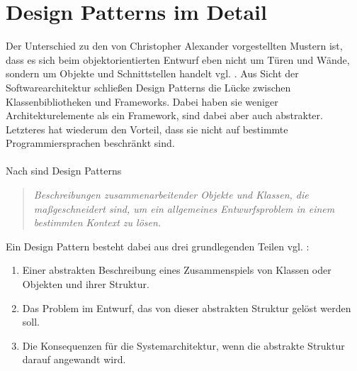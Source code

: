 \documentclass[fontsize=11pt,a4paper,final]{scrreprt}[2003/01/01]
\begin{document}
\chapter{Design Patterns im Detail}\label{se:Design Patterns im Detail}
Der Unterschied zu den von Christopher Alexander vorgestellten Mustern ist, dass es sich beim objektorientierten Entwurf eben nicht um Türen und Wände, sondern um Objekte und Schnittstellen handelt vgl. \cite[S. 3]{gamma2004}.
Aus Sicht der Softwarearchitektur schließen Design Patterns die Lücke zwischen Klassenbibliotheken und Frameworks. Dabei haben sie weniger Architekturelemente als ein Framework, sind dabei aber auch abstrakter. Letzteres hat wiederum den Vorteil, dass sie nicht auf bestimmte Programmiersprachen beschränkt sind. \\ \\
Nach \cite[S. 4]{gamma2004} sind Design Patterns 

\begin{quote}
	\textit{\glqq Beschreibungen zusammenarbeitender Objekte und Klassen, die maßgeschneidert sind, um ein allgemeines Entwurfsproblem in einem bestimmten Kontext zu lösen\grqq.}
\end{quote} 
\smallskip
Ein Design Pattern besteht dabei aus drei grundlegenden Teilen vgl. \cite{Gamma1993}:
\begin{enumerate}
	\item Einer abstrakten Beschreibung eines Zusammenspiels von Klassen oder Objekten und ihrer Struktur.
	\item Das Problem im Entwurf, das von dieser abstrakten Struktur gelöst werden soll.
	\item Die Konsequenzen für die Systemarchitektur, wenn die abstrakte Struktur darauf angewandt wird.
\end{enumerate}	
\end{document}
